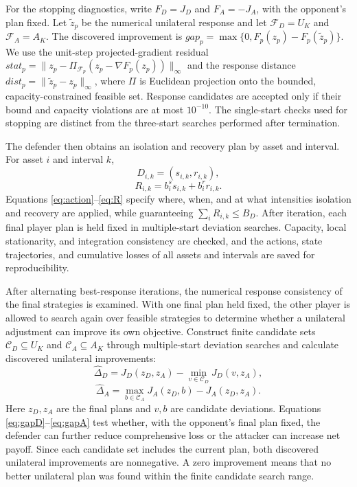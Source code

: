 \documentclass[conference,letterpaper]{IEEEtran}
\begin{document}
For the stopping diagnostics, write $F_D=J_D$ and $F_A=-J_A$, with the opponent's plan fixed. Let $\widetilde z_p$ be the numerical unilateral response and let $\mathcal F_D=U_K$ and $\mathcal F_A=A_K$. The discovered improvement is $gap_p=\max\{0,F_p(z_p)-F_p(\widetilde z_p)\}$. We use the unit-step projected-gradient residual $stat_p=\|z_p-\Pi_{\mathcal F_p}(z_p-\nabla F_p(z_p))\|_\infty$ and the response distance $dist_p=\|\widetilde z_p-z_p\|_\infty$, where $\Pi$ is Euclidean projection onto the bounded, capacity-constrained feasible set. Response candidates are accepted only if their bound and capacity violations are at most $10^{-10}$. The single-start checks used for stopping are distinct from the three-start searches performed after termination.

The defender then obtains an isolation and recovery plan by asset and interval. For asset $i$ and interval $k$,
\begin{equation}\label{eq:action}
D_{i,k}=(s_{i,k},r_{i,k}),
\end{equation}
\begin{equation}\label{eq:R}
R_{i,k}=b_i^s s_{i,k}+b_i^r r_{i,k}.
\end{equation}
Equations \eqref{eq:action}--\eqref{eq:R} specify where, when, and at what intensities isolation and recovery are applied, while guaranteeing $\sum_i R_{i,k}\le B_D$. After iteration, each final player plan is held fixed in multiple-start deviation searches. Capacity, local stationarity, and integration consistency are checked, and the actions, state trajectories, and cumulative losses of all assets and intervals are saved for reproducibility.

After alternating best-response iterations, the numerical response consistency of the final strategies is examined. With one final plan held fixed, the other player is allowed to search again over feasible strategies to determine whether a unilateral adjustment can improve its own objective. Construct finite candidate sets $\mathcal C_D\subseteq U_K$ and $\mathcal C_A\subseteq A_K$ through multiple-start deviation searches and calculate discovered unilateral improvements:
\begin{equation}\label{eq:gapD}
\widehat\Delta_D=J_D(z_D,z_A)-\min_{v\in\mathcal C_D}J_D(v,z_A),
\end{equation}
\begin{equation}\label{eq:gapA}
\widehat\Delta_A=\max_{b\in\mathcal C_A}J_A(z_D,b)-J_A(z_D,z_A).
\end{equation}
Here $z_D,z_A$ are the final plans and $v,b$ are candidate deviations. Equations \eqref{eq:gapD}--\eqref{eq:gapA} test whether, with the opponent's final plan fixed, the defender can further reduce comprehensive loss or the attacker can increase net payoff. Since each candidate set includes the current plan, both discovered unilateral improvements are nonnegative. A zero improvement means that no better unilateral plan was found within the finite candidate search range.
\end{document}
